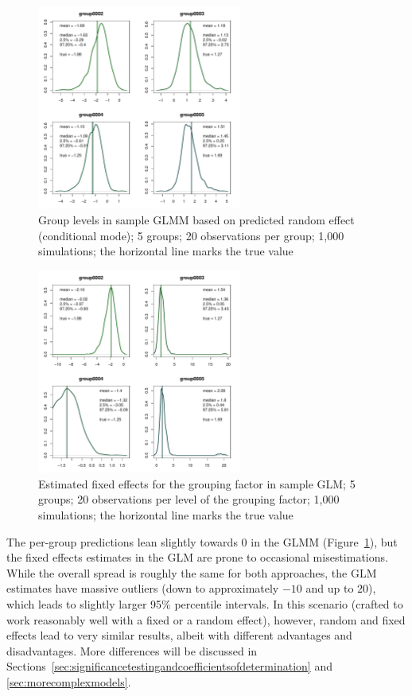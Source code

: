 \documentclass[a4paper,12pt]{article}
\begin{document}
\begin{figure}[!htpb]
  \centering
  \includegraphics[width=0.6\textwidth]{graphics/glmmj5i20}
  \caption{Group levels in sample GLMM based on predicted random effect (conditional mode); 5 groups; 20 observations per group; 1,000 simulations; the horizontal line marks the true value}
  \label{fig:glmmj5i20}
\end{figure}
\begin{figure}[!htpb]
  \centering
  \includegraphics[width=0.6\textwidth]{graphics/glmj5i20}
  \caption{Estimated fixed effects for the grouping factor in sample GLM; 5 groups; 20 observations per level of the grouping factor; 1,000 simulations; the horizontal line marks the true value}
  \label{fig:glmj5i20}
\end{figure}

The per-group predictions lean slightly towards $0$ in the GLMM (Figure~\ref{fig:glmmj5i20}), but the fixed effects estimates in the GLM are prone to occasional misestimations.
While the overall spread is roughly the same for both approaches, the GLM estimates have massive outliers (down to approximately $-10$ and up to $20$), which leads to slightly larger 95\% percentile intervals.
In this scenario (crafted to work reasonably well with a fixed or a random effect), however, random and fixed effects lead to very similar results, albeit with different advantages and disadvantages.
More differences will be discussed in Sections~\ref{sec:significancetestingandcoefficientsofdetermination} and \ref{sec:morecomplexmodels}.
\end{document}
